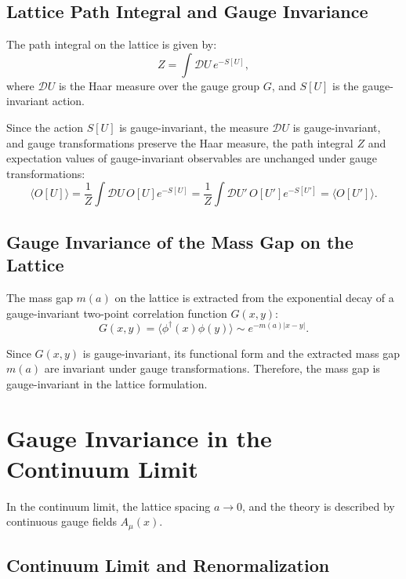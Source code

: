 \subsection{Lattice Path Integral and Gauge Invariance}

The path integral on the lattice is given by:
\begin{equation}
Z = \int \mathcal{D}U \, e^{-S[U]},
\end{equation}
where \(\mathcal{D}U\) is the Haar measure over the gauge group \(G\), and \(S[U]\) is the gauge-invariant action.

Since the action \(S[U]\) is gauge-invariant, the measure \(\mathcal{D}U\) is gauge-invariant, and gauge transformations preserve the Haar measure, the path integral \(Z\) and expectation values of gauge-invariant observables are unchanged under gauge transformations:
\begin{equation}
\langle O[U] \rangle = \frac{1}{Z} \int \mathcal{D}U \, O[U] e^{-S[U]} = \frac{1}{Z} \int \mathcal{D}U' \, O[U'] e^{-S[U']} = \langle O[U'] \rangle.
\end{equation}

\subsection{Gauge Invariance of the Mass Gap on the Lattice}

The mass gap \(m(a)\) on the lattice is extracted from the exponential decay of a gauge-invariant two-point correlation function \(G(x, y)\):
\begin{equation}
G(x, y) = \langle \phi^\dagger(x) \phi(y) \rangle \sim e^{-m(a) |x-y|}.
\end{equation}

Since \(G(x, y)\) is gauge-invariant, its functional form and the extracted mass gap \(m(a)\) are invariant under gauge transformations. Therefore, the mass gap is gauge-invariant in the lattice formulation.



\section{Gauge Invariance in the Continuum Limit}

In the continuum limit, the lattice spacing \(a \to 0\), and the theory is described by continuous gauge fields \(A_\mu(x)\). 

\subsection{Continuum Limit and Renormalization}

